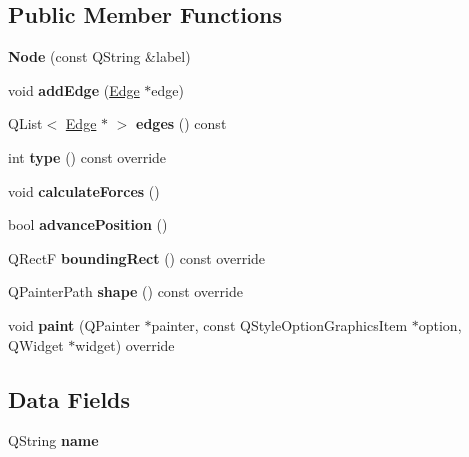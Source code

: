 \subsection*{Public Member Functions}
\begin{DoxyCompactItemize}
\item 
\mbox{\label{class_node_a9bd720da4ba65a71212e729eb647d711}} 
{\bfseries Node} (const Q\+String \&label)
\item 
\mbox{\label{class_node_af761aaef36a761a90c4f148a6add914d}} 
void {\bfseries add\+Edge} (\mbox{\hyperlink{class_edge}{Edge}} $\ast$edge)
\item 
\mbox{\label{class_node_a07ef0b35412d954c6e585c25377830ff}} 
Q\+List$<$ \mbox{\hyperlink{class_edge}{Edge}} $\ast$ $>$ {\bfseries edges} () const
\item 
\mbox{\label{class_node_af48418d690ba7a21aea37168beaa865a}} 
int {\bfseries type} () const override
\item 
\mbox{\label{class_node_ad072483ca1a8d884964cddef6b3e7f6f}} 
void {\bfseries calculate\+Forces} ()
\item 
\mbox{\label{class_node_a60605ce8c5281cad180745359f833cc4}} 
bool {\bfseries advance\+Position} ()
\item 
\mbox{\label{class_node_a327ee966db1211cee4b9759bd928580a}} 
Q\+RectF {\bfseries bounding\+Rect} () const override
\item 
\mbox{\label{class_node_a0b1a8467340a3554ac57b43f56a90818}} 
Q\+Painter\+Path {\bfseries shape} () const override
\item 
\mbox{\label{class_node_a35fd12d92a7ca5d7679c81ab6747a764}} 
void {\bfseries paint} (Q\+Painter $\ast$painter, const Q\+Style\+Option\+Graphics\+Item $\ast$option, Q\+Widget $\ast$widget) override
\end{DoxyCompactItemize}
\subsection*{Data Fields}
\begin{DoxyCompactItemize}
\item 
\mbox{\label{class_node_ad864ab24f394b18f2ed1fdb56b3340eb}} 
Q\+String {\bfseries name}
\end{DoxyCompactItemize}
